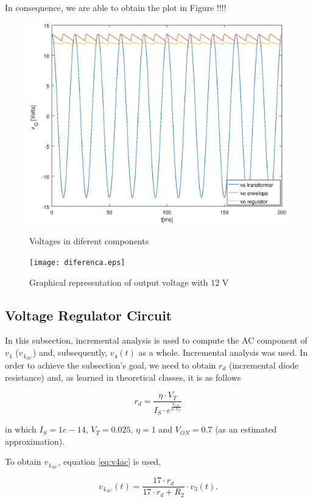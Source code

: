 In consequence, we are able to obtain the plot in Figure !!!!

\begin{figure}[h]
\centering
\caption{Voltages in diferent components}
\includegraphics[width=0.6\linewidth]{V_todas.eps}
\label{plot3}
\end{figure}

\begin{figure}[h]
\centering
\caption{Graphical representation of output voltage with 12 V}
\texttt{[image: diferenca.eps]}
\label{plot4}
\end{figure}

\subsection{Voltage Regulator Circuit}
\label{subsec:theo_vr}

In this subsection, incremental analysis is used to compute the AC component of $v_4$ ($v_{4_{AC}}$) and, subsequently, $v_4(t)$ as a whole. Incremental analysis was used. In order to achieve the subsection's goal, we need to obtain $r_d$ (incremental diode resistance) and, as learned in theoretical classes, it is as follows

\begin{equation}
    r_d = \frac{\eta \cdot V_T}{I_S \cdot e^{\frac{V_{ON}}{\eta \cdot V_T}}}
    \label{eq:rd}
\end{equation}

in which $I_S=1e-14$, $V_T=0.025$, $\eta = 1$ and $V_{ON}=0.7$ (as an estimated approximation).

To obtain $v_{4_{AC}}$, equation \ref{eq:v4ac} is used,

\begin{equation}
    v_{4_{AC}}(t) = \frac{17 \cdot r_d}{17 \cdot r_d + R_2} \cdot v_3(t).
    \label{eq:v4ac}
\end{equation}

